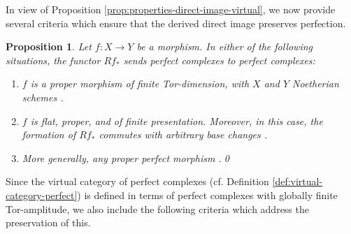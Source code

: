 \documentclass[11pt]{article}
\newcommand{\cf}{cf.\xspace}
\theoremstyle{plain}
\newtheorem{proposition}[theorem]{Proposition}
\theoremstyle{definition}
\begin{document}
In view of Proposition \ref{prop:properties-direct-image-virtual}, we now provide several criteria which ensure that the derived direct image preserves perfection.
\begin{proposition}\label{prop:perfect-conditions}
Let $f: X\to Y$ be a morphism. In either of the following situations, the functor $Rf_\ast$ sends perfect complexes to perfect complexes:
\begin{enumerate}
\item\label{item:perfect-conditions-1} $f$ is a proper morphism of finite Tor-dimension, with $X$ and $Y$ Noetherian schemes \cite[\href{https://stacks.math.columbia.edu/tag/0B6G}{0B6G}]{stacks-project} \cite[\href{https://stacks.math.columbia.edu/tag/0684}{0684}]{stacks-project}
\cite[\href{https://stacks.math.columbia.edu/tag/069C}{069C}]{stacks-project}.
\item\label{item:perfect-conditions-2} $f$ is flat, proper, and of finite presentation. Moreover, in this case, the formation of $Rf_\ast $ commutes with arbitrary base changes \cite[\href{https://stacks.math.columbia.edu/tag/0B91}{0B91}]{stacks-project}.
\item\label{item:perfect-conditions-3} More generally, any proper perfect morphism \cite[Ex.\,2.2(a)]{LipNee}.\qed
\end{enumerate}
\end{proposition}

Since the virtual category of perfect complexes (\cf Definition \ref{def:virtual-category-perfect}) is defined in terms of perfect complexes with globally finite Tor-amplitude, we also include the following criteria which address the preservation of this.
\end{document}
